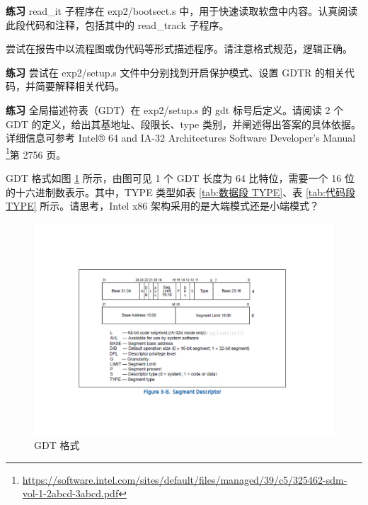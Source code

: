 \begin{mdframed}[hidealllines=true,backgroundcolor=gray!20]
\textbf{练习 }read\_it 子程序在 exp2/bootsect.s 中，用于快速读取软盘中内容。认真阅读此段代码和注释，包括其中的 read\_track 子程序。

尝试在报告中以流程图或伪代码等形式描述程序。请注意格式规范，逻辑正确。
\end{mdframed}

\begin{mdframed}[hidealllines=true,backgroundcolor=gray!20]
\textbf{练习 }尝试在 exp2/setup.s 文件中分别找到开启保护模式、设置 GDTR 的相关代码，并简要解释相关代码。
\end{mdframed}

\begin{mdframed}[hidealllines=true,backgroundcolor=gray!20]
\textbf{练习 }全局描述符表（GDT）在 exp2/setup.s 的 gdt 标号后定义。请阅读 2 个 GDT 的定义，给出其基地址、段限长、type 类别，并阐述得出答案的具体依据。详细信息可参考 Intel® 64 and IA-32 Architectures Software Developer’s Manual \footnote{\url{https://software.intel.com/sites/default/files/managed/39/c5/325462-sdm-vol-1-2abcd-3abcd.pdf}}第 2756 页。

GDT 格式如图 \ref{fig:GDT格式} 所示，由图可见 1 个 GDT 长度为 64 比特位，需要一个 16 位的十六进制数表示。其中，TYPE 类型如表 \ref{tab:数据段 TYPE}、表 \ref{tab:代码段 TYPE} 所示。请思考，Intel x86 架构采用的是大端模式还是小端模式？
\end{mdframed}

\begin{figure}[htbp]
    \centering
    \includegraphics[width=\textwidth]{img/GDT格式.pdf}
    \caption{GDT 格式}
    \label{fig:GDT格式}
\end{figure}

